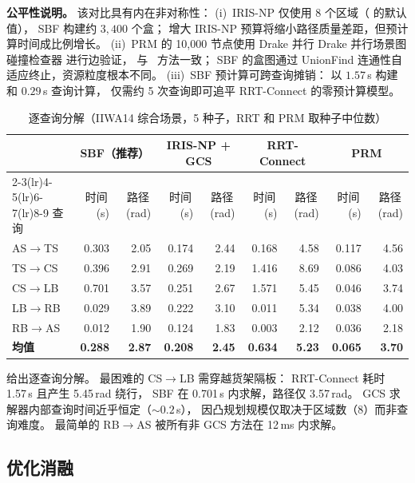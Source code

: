 \documentclass[journal]{IEEEtran}
\begin{document}
\textbf{公平性说明。}
该对比具有内在非对称性：
(i)~IRIS-NP 仅使用 8 个区域（\cite{marcucci2024motion} 的默认值），
    SBF 构建约 $3{,}400$ 个盒；
    增大 IRIS-NP 预算将缩小路径质量差距，但预计算时间成比例增长。
(ii)~PRM 的 10{,}000 节点使用 Drake 并行
    Drake 并行场景图碰撞检查器 进行边验证，
    与~\cite{marcucci2024motion} 方法一致；
    SBF 的盒图通过 UnionFind 连通性自适应终止，资源粒度根本不同。
(iii)~SBF 预计算可跨查询摊销：
    以 $1.57$\,s 构建和 $0.29$\,s 查询计算，
    仅需约 5 次查询即可追平 RRT-Connect 的零预计算模型。
\begin{table}[t]
\centering
\caption{逐查询分解（IIWA14 综合场景，5 种子，RRT 和 PRM 取种子中位数）}
\label{tab:per_query}
\small
\begin{tabular}{@{}l rr rr rr rr@{}}
\toprule
 & \multicolumn{2}{c}{\textbf{SBF（推荐）}}
 & \multicolumn{2}{c}{\textbf{IRIS-NP + GCS}}
 & \multicolumn{2}{c}{\textbf{RRT-Connect}}
 & \multicolumn{2}{c}{\textbf{PRM}} \\
\cmidrule(lr){2-3}\cmidrule(lr){4-5}\cmidrule(lr){6-7}\cmidrule(lr){8-9}
查询 & 时间\,(s) & 路径\,(rad) & 时间\,(s) & 路径\,(rad) & 时间\,(s) & 路径\,(rad) & 时间\,(s) & 路径\,(rad) \\
\midrule
  AS$\to$TS & 0.303 & 2.05 & 0.174 & 2.44 & 0.168 & 4.58 & 0.117 & 4.56 \\
  TS$\to$CS & 0.396 & 2.91 & 0.269 & 2.19 & 1.416 & 8.69 & 0.086 & 4.03 \\
  CS$\to$LB & 0.701 & 3.57 & 0.251 & 2.67 & 1.571 & 5.45 & 0.046 & 3.74 \\
  LB$\to$RB & 0.029 & 3.89 & 0.222 & 3.10 & 0.011 & 5.34 & 0.038 & 4.00 \\
  RB$\to$AS & 0.012 & 1.90 & 0.124 & 1.83 & 0.003 & 2.12 & 0.036 & 2.18 \\
\midrule
  \textbf{均值} & \textbf{0.288} & \textbf{2.87} & \textbf{0.208} & \textbf{2.45} & \textbf{0.634} & \textbf{5.23} & \textbf{0.065} & \textbf{3.70} \\
\bottomrule
\end{tabular}
\end{table}

 给出逐查询分解。
最困难的 CS$\to$LB 需穿越货架隔板：
RRT-Connect 耗时 1.57\,s 且产生 5.45\,rad 绕行，
SBF 在 0.701\,s 内求解，路径仅 3.57\,rad。
GCS 求解器内部查询时间近乎恒定（${\sim}0.2$\,s），
因凸规划规模仅取决于区域数（8）而非查询难度。
最简单的 RB$\to$AS 被所有非 GCS 方法在 12\,ms 内求解。

\subsection{优化消融}\label{sec:exp_ablation}
\end{document}
